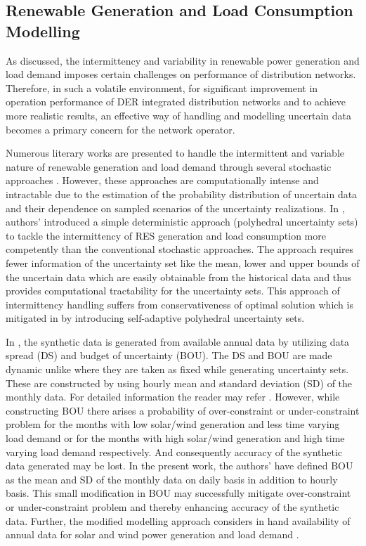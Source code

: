 \documentclass[journal]{IEEEtran}
\begin{document}
\subsection{Renewable Generation and Load Consumption Modelling }\label{section:RELC Modeling}
As discussed, the intermittency and variability in renewable power generation and load demand imposes certain challenges on performance of distribution networks. Therefore, in such a volatile environment, for significant improvement in operation performance of DER integrated distribution networks and to achieve more realistic results, an effective way of handling and modelling uncertain data becomes a primary concern for the network operator.
\par Numerous literary works are presented to handle the intermittent and variable nature of renewable generation and load demand through several stochastic approaches \cite{atwa2011probabilistic,malekpour2012multi,zio2015monte,jadoun2018integration}. However, these approaches are computationally intense and intractable due to the estimation of the probability distribution of uncertain data and their dependence on sampled scenarios of the uncertainty realizations\cite{wang2014robust,8272222,gorissen2015practical}. In \cite{wang2014robust}, authors’ introduced a simple deterministic approach (polyhedral uncertainty sets) to tackle the intermittency of RES generation and load consumption more competently than the conventional stochastic approaches. The approach requires fewer information of the uncertainty set like the mean, lower and upper bounds of the uncertain data which are easily obtainable from the historical data and thus provides computational tractability for the uncertainty sets. This approach of intermittency handling suffers from conservativeness of optimal solution which is mitigated in \cite{8272222} by introducing self-adaptive polyhedral uncertainty sets.
\par In \cite{8272222}, the synthetic data is generated from available annual data by utilizing data spread (DS) and budget of uncertainty (BOU). The DS and BOU are made dynamic unlike \cite{wang2014robust} where they are taken as fixed while generating uncertainty sets. These are constructed by using hourly mean and standard deviation (SD) of the monthly data. For detailed information the reader may refer \cite{8272222}. However, while constructing BOU there arises a probability of over-constraint or under-constraint problem for the months with low solar/wind generation and less time varying load demand or for the months with high solar/wind generation and high time varying load demand respectively. And consequently accuracy of the synthetic data generated may be lost. In the present work, the authors’ have defined BOU as the mean and SD of the monthly data on daily basis in addition to hourly basis. This small modification in BOU may successfully mitigate over-constraint or under-constraint problem and thereby enhancing accuracy of the synthetic data. Further, the modified modelling approach considers in hand availability of annual data for solar and wind power generation and load demand \cite{nrel,posoco}.
\end{document}
